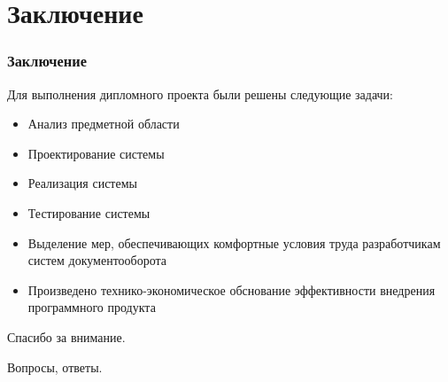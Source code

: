 \documentclass[xcolor=pdftex, dvipsnames, table]{beamer}
\begin{document}
\section{Заключение}
\begin{frame}
  \frametitle{Заключение}
  Для выполнения дипломного проекта были решены следующие задачи:
  \begin{itemize}
    \item Анализ предметной области
    \item Проектирование системы
    \item Реализация системы
    \item Тестирование системы
    \item Выделение мер, обеспечивающих комфортные условия труда разработчикам систем документооборота
    \item Произведено технико-экономическое обснование эффективности внедрения программного продукта
  \end{itemize}
\end{frame}
\begin{frame}
  \begin{center}
    \begin{huge}
      Спасибо за внимание.
    \end{huge}

    Вопросы, ответы.
  \end{center}
\end{frame}
\end{document}
